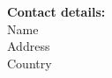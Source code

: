 
\vspace*{3\baselineskip}
\large{\textbf{Contact details:}}\\
Name\\
Address  \\
Country \\
\newpage
